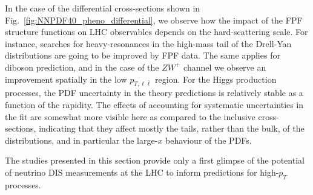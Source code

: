 In the case of the differential cross-sections shown in Fig.~\ref{fig:NNPDF40_pheno_differential},
we observe how the impact of the FPF structure functions on LHC observables depends
on the hard-scattering scale.
%
For instance, searches for heavy-resonances in the high-mass tail of the Drell-Yan
distributions are going to be improved by FPF data.
%
The same applies for diboson prediction, and in the case of the $ZW^+$ channel we observe
an improvement spatially in the low $p_{T,\ell\bar{\ell}}$ region.
%
For the Higgs production processes, the PDF uncertainty in the theory predictions is relatively
stable as a function of the rapidity.
%
The effects of accounting for systematic uncertainties in the fit are somewhat more visible
here as compared to the inclusive cross-sections, indicating that they affect mostly
the tails, rather than the bulk, of the distributions, and in particular the large-$x$
behaviour of the PDFs.

The studies presented in this section provide only a first glimpse of the potential
of neutrino DIS measurements at the LHC to inform predictions for high-$p_T$ processes.


